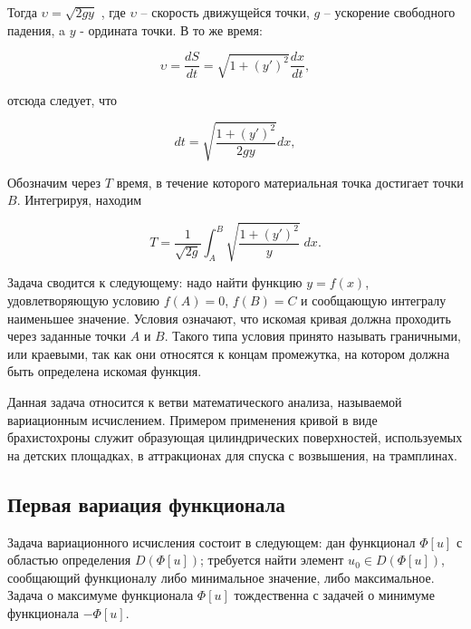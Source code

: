 \documentclass{article}
\begin{document}
Тогда $\upsilon = \sqrt{2gy}$ , где $\upsilon$ – скорость движущейся точки, $g$ – ускорение свободного падения, a $y$ - ордината точки. В то же время:

\begin{displaymath}
    \upsilon = \frac{dS}{dt} = \sqrt{1 + (y')^2} \frac{dx}{dt},
\end{displaymath}

\noindent отсюда следует, что

\begin{displaymath}
    dt = \sqrt{\frac{1 + (y')^2}{2gy}}dx,
\end{displaymath}

\noindent Обозначим через $T$ время, в течение которого материальная точка достигает точки $B$. Интегрируя, находим

\begin{displaymath}
    T = \frac{1}{\sqrt{2g}} \int_{A}^{B} \sqrt{\frac{1 + (y')^2}{y}} \; dx.
\end{displaymath}

\noindent Задача сводится к следующему: надо найти функцию $y = f(x)$, удовлетворяющую условию $f(A) = 0$, $f(B) = C$ и сообщающую интегралу наименьшее значение. Условия означают, что искомая кривая должна проходить через заданные точки $A$ и $B$. Такого типа условия принято называть граничными, или краевыми, так как они относятся к концам промежутка, на котором должна быть определена искомая функция.

\begin{info}
	Данная задача относится к ветви математического анализа, называемой вариационным исчислением. Примером применения кривой в виде брахистохроны служит образующая цилиндрических поверхностей, используемых на детских площадках, в аттракционах для спуска с возвышения, на трамплинах.
\end{info}


\subsection{Первая вариация функционала}

Задача вариационного исчисления состоит в следующем: дан функционал $\Phi[u]$ с областью определения $D(\Phi[u])$; требуется найти элемент $u_{0} \in D(\Phi[u])$, сообщающий функционалу либо минимальное значение, либо максимальное. Задача о максимуме функционала $\Phi[u]$ тождественна с задачей о минимуме функционала $- \Phi[u]$.
\end{document}
